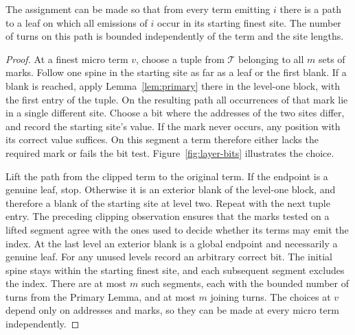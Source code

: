 \begin{lemma}\label{lem:emission-escape}
The assignment can be made so that from every term emitting \(i\)
there is a path to a leaf on which all emissions of \(i\) occur in
its starting finest site. The number of turns on this path is bounded
independently of the term and the site lengths.
\end{lemma}
\begin{proof}
At a finest micro term \(v\), choose a tuple from \(\mathcal T\)
belonging to all \(m\) sets of marks. Follow one spine in the starting
site as far as a leaf or the first blank. If a blank is reached, apply
Lemma~\ref{lem:primary} there in the level-one block, with the first
entry of the tuple. On the resulting path all occurrences of that mark
lie in a single different site. Choose a bit where the addresses of the
two sites differ, and record the starting site's value. If the mark
never occurs, any position with its correct value suffices. On this
segment a term therefore either lacks the required mark or fails the
bit test. Figure~\ref{fig:layer-bits} illustrates the choice.

Lift the path from the clipped term to the original term. If the endpoint
is a genuine leaf, stop. Otherwise it is an exterior blank of the
level-one block, and therefore a blank of the starting site at level two.
Repeat with the next tuple entry. The preceding clipping observation
ensures that the marks tested on a lifted segment agree with the ones
used to decide whether its terms may emit the index. At the last level
an exterior blank is a global endpoint and necessarily a genuine leaf.
For any unused levels record an arbitrary correct bit. The initial
spine stays within the starting finest site, and each subsequent
segment excludes the index. There are at most \(m\) such segments,
each with the bounded number of turns from the Primary Lemma, and at
most \(m\) joining turns. The choices at \(v\) depend only on addresses
and marks, so they can be made at every micro term independently.
\end{proof}

